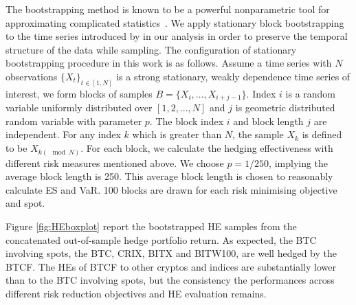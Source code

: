 The bootstrapping method is known to be a powerful nonparametric tool for approximating complicated statistics~\citep{efron1994introduction, davison1997bootstrap}.
We apply stationary block bootstrapping to the time series introduced by \cite{Politis1994} in our analysis in order to preserve the temporal structure of the data while sampling.
The configuration of stationary bootstrapping procedure in this work is as follows.
Assume a time series with $N$ observations $\{X_t\}_{t \in [1,N]}$ is a strong stationary, weakly dependence time series of interest,
we form blocks of samples $B = \{X_i, ..., X_{i+j-1}\}$.
Index $i$ is a random variable uniformly distributed over
$[1,2,...,N]$ and $j$ is geometric distributed random variable with parameter $p$.
The block index $i$ and block length $j$ are independent.
For any index $k$ which is greater than $N$, the sample $X_k$ is defined to be $X_{k(\mod N)}$.
For each block, we calculate the hedging effectiveness with different risk measures mentioned above.
We choose $p=1/250$, implying the average block length is 250.
This average block length is chosen to reasonably calculate ES and VaR.
100 blocks are drawn for each risk minimising objective and
spot. \medskip

Figure \ref{fig:HEboxplot} report the bootstrapped HE samples from the concatenated out-of-sample hedge portfolio return.
As expected, the BTC involving spots, the BTC, CRIX, BITX and BITW100, are well hedged by the BTCF.
The HEs of BTCF to other cryptos and indices are substantially lower than to the BTC involving spots, but the consistency the performances across different risk reduction objectives and HE evaluation remains.



